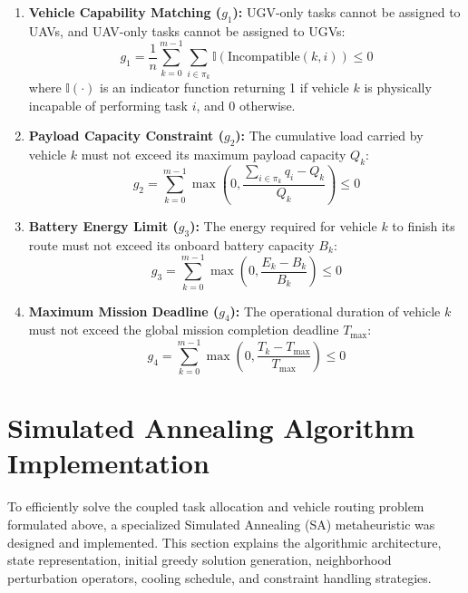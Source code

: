 \begin{enumerate}
    \item \textbf{Vehicle Capability Matching ($g_1$):} UGV-only tasks cannot be assigned to UAVs, and UAV-only tasks cannot be assigned to UGVs:
    \begin{equation}
        g_1 = \frac{1}{n} \sum_{k=0}^{m-1} \sum_{i \in \pi_k} \mathbb{I}\left(\text{Incompatible}(k, i)\right) \le 0
    \end{equation}
    where $\mathbb{I}(\cdot)$ is an indicator function returning 1 if vehicle $k$ is physically incapable of performing task $i$, and 0 otherwise.

    \item \textbf{Payload Capacity Constraint ($g_2$):} The cumulative load carried by vehicle $k$ must not exceed its maximum payload capacity $Q_k$:
    \begin{equation}
        g_2 = \sum_{k=0}^{m-1} \max\left(0, \frac{\sum_{i \in \pi_k} q_i - Q_k}{Q_k}\right) \le 0
    \end{equation}

    \item \textbf{Battery Energy Limit ($g_3$):} The energy required for vehicle $k$ to finish its route must not exceed its onboard battery capacity $B_k$:
    \begin{equation}
        g_3 = \sum_{k=0}^{m-1} \max\left(0, \frac{E_k - B_k}{B_k}\right) \le 0
    \end{equation}

    \item \textbf{Maximum Mission Deadline ($g_4$):} The operational duration of vehicle $k$ must not exceed the global mission completion deadline $T_{\max}$:
    \begin{equation}
        g_4 = \sum_{k=0}^{m-1} \max\left(0, \frac{T_k - T_{\max}}{T_{\max}}\right) \le 0
    \end{equation}
\end{enumerate}

\section{Simulated Annealing Algorithm Implementation}\label{sec:sa_implementation}
To efficiently solve the coupled task allocation and vehicle routing problem formulated above, a specialized Simulated Annealing (SA) metaheuristic was designed and implemented. This section explains the algorithmic architecture, state representation, initial greedy solution generation, neighborhood perturbation operators, cooling schedule, and constraint handling strategies.

